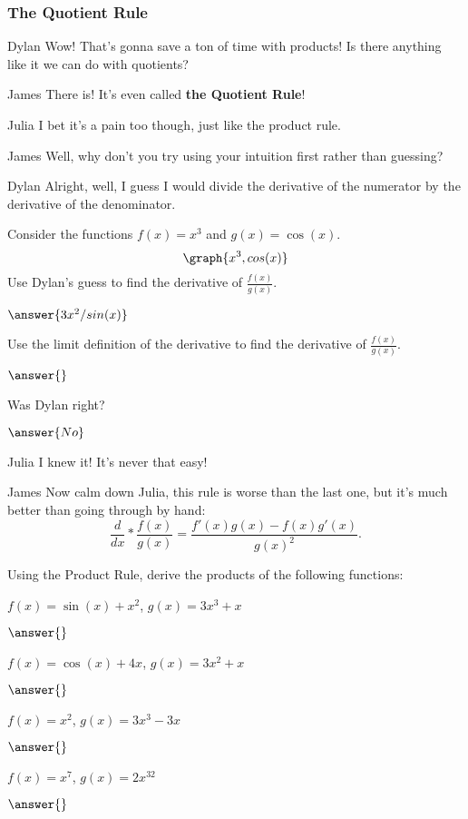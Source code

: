 \documentclass{ximera}
\begin{document}
\subsubsection{The Quotient Rule}
\begin{dialogue}
\item[Dylan] Wow! That's gonna save a ton of time with products! Is there anything like it we can do with quotients?
\item[James] There is! It's even called \textbf{the Quotient Rule}!
\item[Julia] I bet it's a pain too though, just like the product rule.
\item[James] Well, why don't you try using your intuition first rather than guessing?
\item[Dylan] Alright, well, I guess I would divide the derivative of the numerator by the derivative of the denominator.
\end{dialogue}
\begin{question}
Consider the functions $f(x) = x^3$ and $g(x) = \cos(x)$.
\[
\graph{x^3, cos(x)}
\]
Use Dylan's guess to find the derivative of $\frac{f(x)}{g(x)}$.

$\answer{3x^2/sin(x)}$

Use the limit definition of the derivative to find the derivative of $\frac{f(x)}{g(x)}$.

$\answer{}$

Was Dylan right?

$\answer{No}$
\end{question}
\begin{dialogue}
\item[Julia] I knew it! It's never that easy!
\item[James] Now calm down Julia, this rule is worse than the last one, but it's much better than going through by hand: $$\frac{d}{dx}*\frac{f(x)}{g(x)} = \frac{f'(x)g(x)-f(x)g'(x)}{g(x)^2}\text{.}$$
\end{dialogue}
\begin{question}
Using the Product Rule, derive the products of the following functions:

$f(x) = \sin(x)+x^2$, $g(x) = 3x^3+x$

$\answer{}$

$f(x) = \cos(x)+4x$, $g(x) = 3x^2+x$

$\answer{}$

$f(x) = x^2$, $g(x) = 3x^3-3x$

$\answer{}$

$f(x) = x^7$, $g(x) = 2x^{32}$

$\answer{}$
\end{question}
\end{document}
